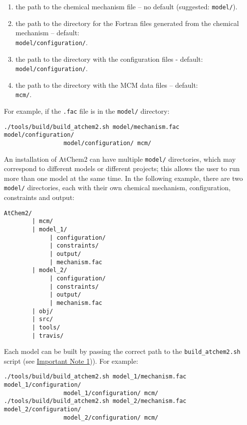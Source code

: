 \begin{enumerate}
\item the path to the chemical mechanism file -- no default
  (suggested: \texttt{model/}).
\item the path to the directory for the Fortran files generated from
  the chemical mechanism -- default:\\ \texttt{model/configuration/}.
\item the path to the directory with the configuration files -
  default:\\ \texttt{model/configuration/}.
\item the path to the directory with the MCM data files -- default:\\
  \texttt{mcm/}.
\end{enumerate}

For example, if the \texttt{.fac} file is in the \texttt{model/}
directory:

\begin{verbatim}
./tools/build/build_atchem2.sh model/mechanism.fac model/configuration/
                 model/configuration/ mcm/
\end{verbatim}

An installation of AtChem2 can have multiple \texttt{model/}
directories, which may correspond to different models or different
projects; this allows the user to run more than one model at the same
time. In the following example, there are two \texttt{model/}
directories, each with their own chemical mechanism, configuration,
constraints and output:

\newpage
\begin{verbatim}
AtChem2/
        | mcm/
        | model_1/
             | configuration/
             | constraints/
             | output/
             | mechanism.fac
        | model_2/
             | configuration/
             | constraints/
             | output/
             | mechanism.fac
        | obj/
        | src/
        | tools/
        | travis/
\end{verbatim}

Each model can be built by passing the correct path to the
\texttt{build\_atchem2.sh} script (see \hyperref[important-note-1]{Important
  Note 1})). For example:

\begin{verbatim}
./tools/build/build_atchem2.sh model_1/mechanism.fac model_1/configuration/
                 model_1/configuration/ mcm/
./tools/build/build_atchem2.sh model_2/mechanism.fac model_2/configuration/
                 model_2/configuration/ mcm/
\end{verbatim}

